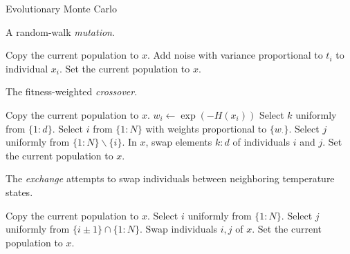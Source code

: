 \documentclass[12pt]{article}\usepackage[]{graphicx}\usepackage[]{color}
\begin{document}
\begin{algorithm}
  \caption{Evolutionary Monte Carlo}
  \label{alg:emc}
  \footnotesize
  \begin{algorithmic}
     
    \State {}
    \Ow 
    \State {}
    \EndWp
    \State  {}
    \EndProcedure
  \end{algorithmic}
\end{algorithm}


\begin{algorithm}
  \caption{A random-walk \emph{mutation}.}
  \label{alg:mutate}
  \footnotesize
  \begin{algorithmic}
    \State Copy the current population to $x$.
    \State Add noise with variance proportional to $t_i$ to individual $x_i$.
    \EndFor
    \State Set the current population to $x$.
    \EndWp
    \EndProcedure
  \end{algorithmic}
\end{algorithm}

\begin{algorithm}
  \caption{The fitness-weighted \emph{crossover}.}
  \label{alg:crossover}
  \footnotesize
  \begin{algorithmic}
    \State Copy the current population to $x$.
    \State $w_i \gets \exp(-H(x_i))$
    \EndFor
    \State Select $k$ uniformly from $\{1\colon d\}.$
    \State Select $i$ from $\{1\colon N\}$ with weights proportional
    to $\{w_\cdot\}$.
    \State Select $j$ uniformly from $\{1\colon N\} \backslash \{i\}.$ 
    \State In $x$, swap elements $k\colon d$ of individuals $i$ and $j$.
    \State  Set the  current population to $x$.
    \EndWp
    \EndProcedure
  \end{algorithmic}
\end{algorithm}

\begin{algorithm}
  \caption{The \emph{exchange} attempts to swap individuals between
    neighboring temperature states.}
  \label{alg:exchange}
  \footnotesize
  \begin{algorithmic}
    \State Copy the current population to $x$.
    \State Select $i$ uniformly from $\{1\colon N\}$. 
    \State Select $j$ uniformly from $\{i\pm 1\}\cap\{1\colon N\}$.
    \State Swap individuals $i,j$ of $x$.
    \State Set the current population to $x$.
    \EndWp
    \EndProcedure
  \end{algorithmic}
\end{algorithm}
\end{document}
